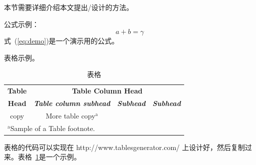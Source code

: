 \documentclass[conference]{IEEEtran}
\begin{document}





本节需要详细介绍本文提出/设计的方法。

公式示例：
\begin{equation}
a+b=\gamma\label{eq:demo}
\end{equation}
式~(\ref{eq:demo})是一个演示用的公式。

表格示例。
\begin{table}[htbp]
\caption{表格}
\begin{center}
\begin{tabular}{|c|c|c|c|}
\hline
\textbf{Table}&\multicolumn{3}{|c|}{\textbf{Table Column Head}} \\
\cline{2-4} 
\textbf{Head} & \textbf{\textit{Table column subhead}}& \textbf{\textit{Subhead}}& \textbf{\textit{Subhead}} \\
\hline
copy& More table copy$^{\mathrm{a}}$& &  \\
\hline
\multicolumn{4}{l}{$^{\mathrm{a}}$Sample of a Table footnote.}
\end{tabular}
\label{tbl:test}
\end{center}
\end{table}
表格的代码可以实现在 http://www.tablesgenerator.com/ 上设计好，然后复制过来。表格~\ref{tbl:test}是一个示例。
\end{document}

